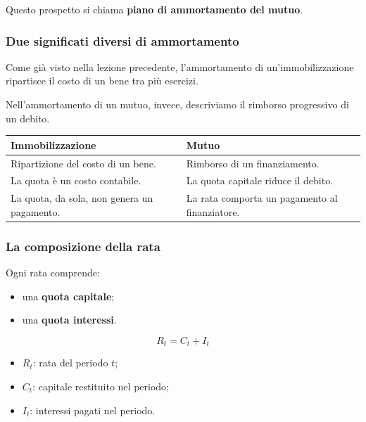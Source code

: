 \noindent Questo prospetto si chiama
\textbf{piano di ammortamento del mutuo}.


\subsubsection*{Due significati diversi di ammortamento}

\noindent Come già visto nella lezione precedente,
l'ammortamento di un'immobilizzazione
ripartisce il costo di un bene
tra più esercizi.

\noindent Nell'ammortamento di un mutuo,
invece, descriviamo
il rimborso progressivo di un debito.

\begin{center}
    \small
    \begin{tabular}{|p{5.5cm}|p{6cm}|}
        \hline
        \textbf{Immobilizzazione}
        & \textbf{Mutuo} \\
        \hline
        Ripartizione del costo di un bene.
        & Rimborso di un finanziamento. \\
        \hline
        La quota è un costo contabile.
        & La quota capitale riduce il debito. \\
        \hline
        La quota, da sola,
        non genera un pagamento.
        & La rata comporta
        un pagamento al finanziatore. \\
        \hline
    \end{tabular}
\end{center}


\subsubsection*{La composizione della rata}

\noindent Ogni rata comprende:

\begin{itemize}
    \item una \textbf{quota capitale};
    \item una \textbf{quota interessi}.
\end{itemize}

\[
\boxed{
R_t=C_t+I_t
}
\]

\begin{itemize}
    \item $R_t$: rata del periodo $t$;
    \item $C_t$: capitale restituito nel periodo;
    \item $I_t$: interessi pagati nel periodo.
\end{itemize}

